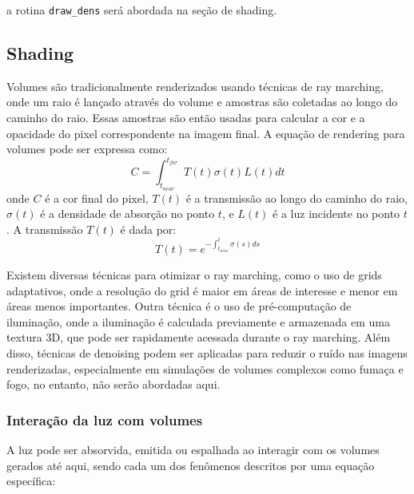 a rotina \texttt{draw\_dens} será abordada na seção de shading.

\subsection{Shading}
\label{sec:shading}

Volumes são tradicionalmente renderizados usando técnicas de ray marching, onde um raio é lançado através do volume e amostras são coletadas ao longo do caminho do raio. Essas amostras são então usadas para calcular a cor e a opacidade do pixel correspondente na imagem final. A equação de rendering para volumes pode ser expressa como:
$$
C = \int_{t_{near}}^{t_{far}} T(t) \sigma(t) L(t) dt
$$
onde $C$ é a cor final do pixel, $T(t)$ é a transmissão ao longo do caminho do raio, $\sigma(t)$ é a densidade de absorção no ponto $t$, e $L(t)$ é a luz incidente no ponto $t$. A transmissão $T(t)$ é dada por:
$$
T(t) = e^{-\int_{t_{near}}^{t} \sigma(s) ds}
$$

Existem diversas técnicas para otimizar o ray marching, como o uso de grids adaptativos, onde a resolução do grid é maior em áreas de interesse e menor em áreas menos importantes. Outra técnica é o uso de pré-computação de iluminação, onde a iluminação é calculada previamente e armazenada em uma textura 3D, que pode ser rapidamente acessada durante o ray marching. Além disso, técnicas de denoising podem ser aplicadas para reduzir o ruído nas imagens renderizadas, especialmente em simulações de volumes complexos como fumaça e fogo, no entanto, não serão abordadas aqui.

\subsubsection{Interação da luz com volumes}

A luz pode ser absorvida, emitida ou espalhada ao interagir com os volumes gerados até aqui, sendo cada um dos fenômenos descritos por uma equação específica:


